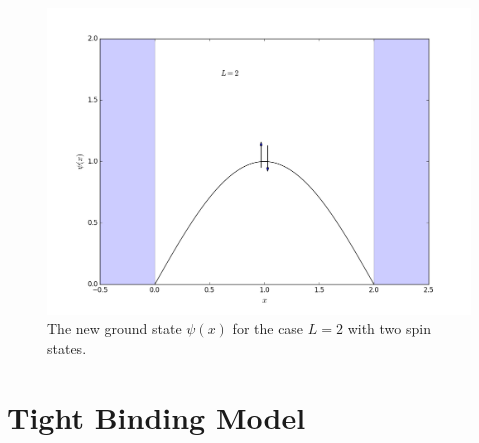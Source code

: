 \documentclass{article}
\begin{document}
\begin{figure}[h]
\centering
\includegraphics[scale=.4]{figure_2_both}
\caption{The new ground state $\psi(x)$ for the case $L = 2$ with two spin states.}
\end{figure}

\section{Tight Binding Model}
\end{document}
